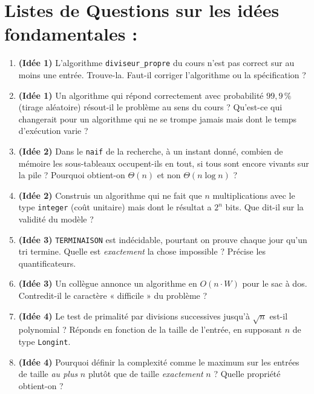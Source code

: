 \documentclass{article}
\begin{document}
\section*{\textbf{Listes de Questions sur les idées fondamentales }:}

\begin{enumerate}

  \item \textbf{(Idée 1)} L'algorithme \texttt{diviseur\_propre} du cours n'est pas correct sur au moins une entrée. Trouve-la. Faut-il corriger l'algorithme ou la spécification ?

  \item \textbf{(Idée 1)} Un algorithme qui répond correctement avec probabilité $99{,}9\,\%$ (tirage aléatoire) résout-il le problème au sens du cours ? Qu'est-ce qui changerait pour un algorithme qui ne se trompe jamais mais dont le temps d'exécution varie ?

  \item \textbf{(Idée 2)} Dans le \texttt{naif} de la recherche, à un instant donné, combien de mémoire les sous-tableaux occupent-ils en tout, si tous sont encore vivants sur la pile ? Pourquoi obtient-on $\Theta(n)$ et non $\Theta(n \log n)$ ?

  \item \textbf{(Idée 2)} Construis un algorithme qui ne fait que $n$ multiplications avec le type \texttt{integer} (coût unitaire) mais dont le résultat a $2^n$ bits. Que dit-il sur la validité du modèle ?

  \item \textbf{(Idée 3)} \texttt{TERMINAISON} est indécidable, pourtant on prouve chaque jour qu'un tri termine. Quelle est \emph{exactement} la chose impossible ? Précise les quantificateurs.

  \item \textbf{(Idée 3)} Un collègue annonce un algorithme en $O(n \cdot W)$ pour le sac à dos. Contredit-il le caractère « difficile » du problème ?

  \item \textbf{(Idée 4)} Le test de primalité par divisions successives jusqu'à $\sqrt{n}$ est-il polynomial ? Réponds en fonction de la taille de l'entrée, en supposant $n$ de type \texttt{Longint}.

  \item \textbf{(Idée 4)} Pourquoi définir la complexité comme le maximum sur les entrées de taille \emph{au plus} $n$ plutôt que de taille \emph{exactement} $n$ ? Quelle propriété obtient-on ?


\end{enumerate}
\end{document}
